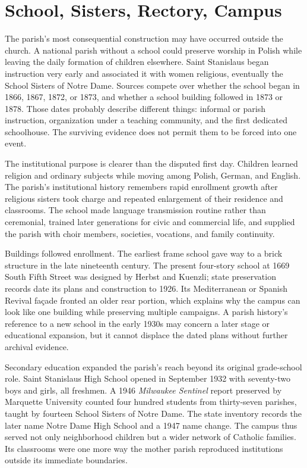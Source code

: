 \section{School, Sisters, Rectory, Campus}

The parish's most consequential construction may have occurred outside the church. A national parish without a school could preserve worship in Polish while leaving the daily formation of children elsewhere. Saint Stanislaus began instruction very early and associated it with women religious, eventually the School Sisters of Notre Dame. Sources compete over whether the school began in 1866, 1867, 1872, or 1873, and whether a school building followed in 1873 or 1878. Those dates probably describe different things: informal or parish instruction, organization under a teaching community, and the first dedicated schoolhouse. The surviving evidence does not permit them to be forced into one event.

The institutional purpose is clearer than the disputed first day. Children learned religion and ordinary subjects while moving among Polish, German, and English. The parish's institutional history remembers rapid enrollment growth after religious sisters took charge and repeated enlargement of their residence and classrooms. The school made language transmission routine rather than ceremonial, trained later generations for civic and commercial life, and supplied the parish with choir members, societies, vocations, and family continuity.

Buildings followed enrollment. The earliest frame school gave way to a brick structure in the late nineteenth century. The present four-story school at 1669 South Fifth Street was designed by Herbst and Kuenzli; state preservation records date its plans and construction to 1926. Its Mediterranean or Spanish Revival façade fronted an older rear portion, which explains why the campus can look like one building while preserving multiple campaigns. A parish history's reference to a new school in the early 1930s may concern a later stage or educational expansion, but it cannot displace the dated plans without further archival evidence.

Secondary education expanded the parish's reach beyond its original grade-school role. Saint Stanislaus High School opened in September 1932 with seventy-two boys and girls, all freshmen. A 1946 \emph{Milwaukee Sentinel} report preserved by Marquette University counted four hundred students from thirty-seven parishes, taught by fourteen School Sisters of Notre Dame. The state inventory records the later name Notre Dame High School and a 1947 name change. The campus thus served not only neighborhood children but a wider network of Catholic families. Its classrooms were one more way the mother parish reproduced institutions outside its immediate boundaries.

